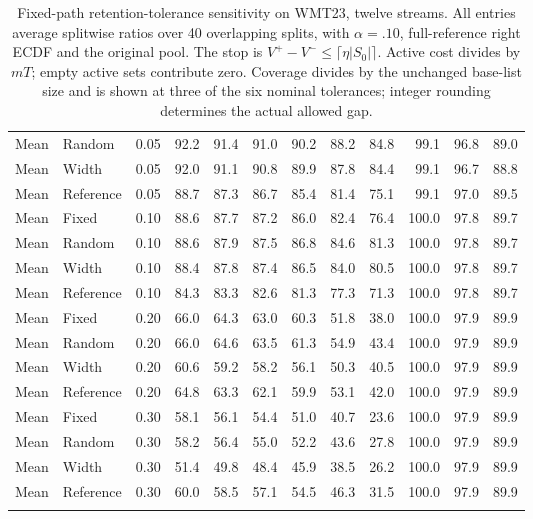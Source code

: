 \begin{table}[t]
\begin{tabular}{llrrrrrrrrrr}
Mean & Random & 0.05 & 92.2 & 91.4 & 91.0 & 90.2 & 88.2 & 84.8 & 99.1 & 96.8 & 89.0 \\
Mean & Width & 0.05 & 92.0 & 91.1 & 90.8 & 89.9 & 87.8 & 84.4 & 99.1 & 96.7 & 88.8 \\
Mean & Reference & 0.05 & 88.7 & 87.3 & 86.7 & 85.4 & 81.4 & 75.1 & 99.1 & 97.0 & 89.5 \\
\addlinespace
Mean & Fixed & 0.10 & 88.6 & 87.7 & 87.2 & 86.0 & 82.4 & 76.4 & 100.0 & 97.8 & 89.7 \\
Mean & Random & 0.10 & 88.6 & 87.9 & 87.5 & 86.8 & 84.6 & 81.3 & 100.0 & 97.8 & 89.7 \\
Mean & Width & 0.10 & 88.4 & 87.8 & 87.4 & 86.5 & 84.0 & 80.5 & 100.0 & 97.8 & 89.7 \\
Mean & Reference & 0.10 & 84.3 & 83.3 & 82.6 & 81.3 & 77.3 & 71.3 & 100.0 & 97.8 & 89.7 \\
\addlinespace
Mean & Fixed & 0.20 & 66.0 & 64.3 & 63.0 & 60.3 & 51.8 & 38.0 & 100.0 & 97.9 & 89.9 \\
Mean & Random & 0.20 & 66.0 & 64.6 & 63.5 & 61.3 & 54.9 & 43.4 & 100.0 & 97.9 & 89.9 \\
Mean & Width & 0.20 & 60.6 & 59.2 & 58.2 & 56.1 & 50.3 & 40.5 & 100.0 & 97.9 & 89.9 \\
Mean & Reference & 0.20 & 64.8 & 63.3 & 62.1 & 59.9 & 53.1 & 42.0 & 100.0 & 97.9 & 89.9 \\
\addlinespace
Mean & Fixed & 0.30 & 58.1 & 56.1 & 54.4 & 51.0 & 40.7 & 23.6 & 100.0 & 97.9 & 89.9 \\
Mean & Random & 0.30 & 58.2 & 56.4 & 55.0 & 52.2 & 43.6 & 27.8 & 100.0 & 97.9 & 89.9 \\
Mean & Width & 0.30 & 51.4 & 49.8 & 48.4 & 45.9 & 38.5 & 26.2 & 100.0 & 97.9 & 89.9 \\
Mean & Reference & 0.30 & 60.0 & 58.5 & 57.1 & 54.5 & 46.3 & 31.5 & 100.0 & 97.9 & 89.9 \\
\addlinespace
\bottomrule
\end{tabular}
\caption{Fixed-path retention-tolerance sensitivity on WMT23, twelve streams. All entries average splitwise ratios over 40 overlapping splits, with $\alpha=.10$, full-reference right ECDF and the original pool. The stop is $V^+-V^-\le\lceil\eta|S_0|\rceil$. Active cost divides by $mT$; empty active sets contribute zero. Coverage divides by the unchanged base-list size and is shown at three of the six nominal tolerances; integer rounding determines the actual allowed gap.}
\label{tab:tolerance-all-2}
\end{table}

